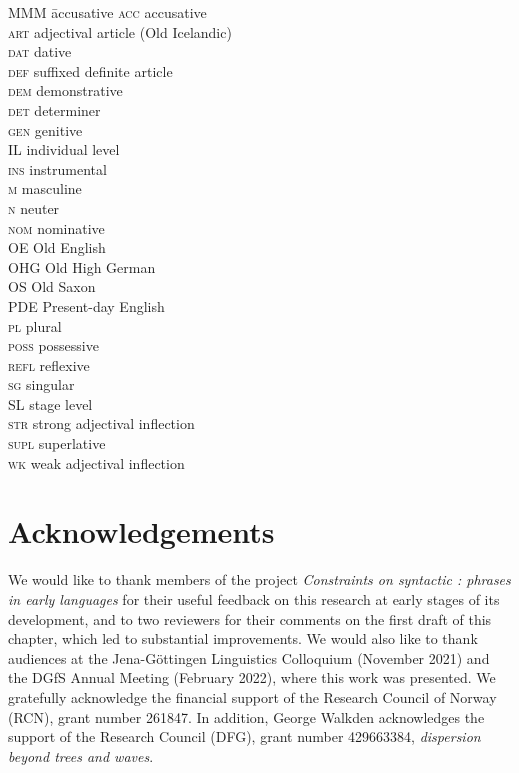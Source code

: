 \documentclass[output=paper,colorlinks,citecolor=brown]{langscibook}
\begin{document}
\begin{multicols}{2}
\begin{tabbing}
MMM \= accusative\kill
\textsc{acc} \> accusative \\
\textsc{art} \> {adjectival article} (Old Icelandic) \\
\textsc{dat} \> {dative} \\
\textsc{def} \> suffixed definite {article}  \\
\textsc{dem} \> {demonstrative} \\
\textsc{det} \> {determiner} \\
\textsc{gen} \> {genitive} \\
IL \> individual level \\
\textsc{ins} \> {instrumental} \\
\textsc{m} \> masculine \\
\textsc{n} \> neuter \\
\textsc{nom} \> {nominative} \\
OE      \> Old English \\ 
OHG     \> Old High German \\ 
OS      \>  Old Saxon \\ 
PDE     \> Present-day English \\ 
\textsc{pl} \> plural \\
\textsc{poss} \> possessive \\
\textsc{refl} \> reflexive \\
\textsc{sg} \> singular \\
SL \> stage level \\
\textsc{str} \> strong {adjectival inflection}  \\
\textsc{supl} \> {superlative} \\
\textsc{wk} \> weak {adjectival inflection}
\end{tabbing}
\end{multicols}

\section*{Acknowledgements}

We would like to thank members of the project \textit{Constraints on syntactic :  phrases in early  languages} for their useful feedback on this research at early stages of its development, and to two  reviewers for their comments on the first draft of this chapter, which led to substantial improvements. We would also like to thank audiences at the Jena-Göttingen  Linguistics Colloquium (November 2021) and the DGfS Annual Meeting (February 2022), where this work was presented. We gratefully acknowledge the financial support of the Research Council of Norway (RCN), grant number 261847. In addition, George Walkden acknowledges the support of the  Research Council (DFG), grant number 429663384, \textit{ dispersion beyond trees and waves}.
\end{document}
